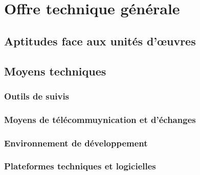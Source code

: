 	\chapter{Offre technique générale}
	
	
	\newpage
	

	\section{Aptitudes face aux unités d'œuvres}
	\section{Moyens techniques}
	\subsection{Outils de suivis}
	\subsection{Moyens de télécommuynication et d'échanges}
	\subsection{Environnement de développement}
	\subsection{Plateformes techniques et logicielles}